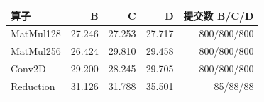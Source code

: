 \begin{tabular}{@{}lrrrr@{}}
\toprule
算子 & B & C & D & 提交数 B/C/D \\
\midrule
MatMul128 & 27.246 & 27.253 & 27.717 & 800/800/800 \\
MatMul256 & 26.424 & 29.810 & 29.458 & 800/800/800 \\
Conv2D & 29.200 & 28.245 & 29.705 & 800/800/800 \\
Reduction & 31.126 & 31.788 & 35.501 & 85/88/88 \\
\bottomrule
\end{tabular}
